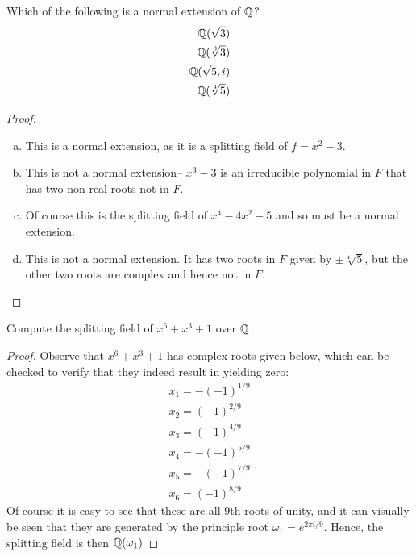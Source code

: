 \documentclass[num=7,duedate=03-24-21,course=Algebra\ II,proflastname=Walton]{hwtemplate}
\begin{document}
\problem[3]
\begin{claim}
	Which of the following is a normal extension of \(\mathbb{Q}\)?
	\begin{align*}
		\mathbb{Q}(\sqrt{3})\\
		\mathbb{Q}(\sqrt[3]{3})\\
		\mathbb{Q}(\sqrt{5} ,i)\\
		\mathbb{Q}(\sqrt[4]{5})
	\end{align*}
\end{claim}
\begin{proof}
	\begin{enumerate}[(a).]
		\item This is a normal extension, as it is a splitting field of \(f=x^2-3\).
		\item This is not a normal extension-- \(x^3-3\) is an irreducible polynomial in \(F\) that has two non-real roots not in \(F\).
		\item Of course this is the splitting field of  \(x^{4}-4x^2-5\) and so must be a normal extension.
		\item This is not a normal extension. It has two roots in \(F\) given by  \(\pm \sqrt[4]{5} \), but the other two roots are complex and hence not in \(F\).
	\end{enumerate}
\end{proof}
\separator

\problem[4]
\begin{claim}
	Compute the splitting field of \(x^{6}+x^3+1\) over \(\mathbb{Q}\)
\end{claim}
\begin{proof}
	Observe that \(x^{6}+x^{3}+1\) has complex roots given below, which can be checked to verify that they indeed result in yielding zero:
	\begin{align*}
		x_1 = -(-1)^{1 / 9}\\
		x_2 = (-1)^{2 / 9}\\
		x_3 = (-1)^{4 / 9}\\
		x_4 = -(-1)^{5 / 9}\\
		x_5 = - (-1)^{7 / 9}\\
		x_6 = (-1)^{8 / 9}
	\end{align*}
	Of course it is easy to see that these are all 9th roots of unity, and it can visually be seen that they are generated by the principle root \(\omega_1 = e^{2 \pi  i / 9}\). Hence, the splitting field is then \(\mathbb{Q}(\omega_1)\)
\end{proof}
\end{document}
